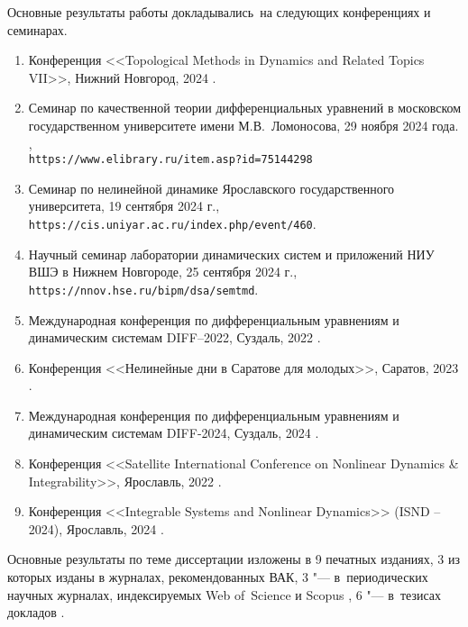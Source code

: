 {\probation}
Основные результаты работы докладывались~на следующих конференциях и семинарах.
\begin{enumerate}
	\item Конференция <<Topological Methods in Dynamics and Related Topics VII>>, Нижний Новгород, 2024 \cite{confbib6}.
	\item Семинар по качественной теории дифференциальных уравнений в московском государственном университете имени М.В.~Ломоносова, 29 ноября 2024 года. \cite{Sergeev2024},\\\texttt{https://www.elibrary.ru/item.asp?id=75144298}
	\item Семинар по нелинейной динамике Ярославского государственного университета, 19 сентября 2024 г.,\\\texttt{https://cis.uniyar.ac.ru/index.php/event/460}.
	\item Научный семинар лаборатории динамических систем и приложений НИУ ВШЭ в Нижнем Новгороде, 25 сентября 2024 г.,\\\texttt{https://nnov.hse.ru/bipm/dsa/semtmd}.
	\item Международная конференция по дифференциальным уравнениям и динамическим системам DIFF--2022, Суздаль, 2022  \cite{confbib1}.
	\item Конференция <<Нелинейные дни в Саратове для молодых>>, Саратов, 2023 \cite{confbib2}.
	\item Международная конференция по дифференциальным уравнениям и динамическим системам DIFF-2024, Суздаль, 2024 \cite{confbib3}.
	\item Конференция <<Satellite International Conference on Nonlinear Dynamics {\&} Integrability>>, Ярославль, 2022 \cite{confbib4}.
	\item Конференция <<Integrable Systems and Nonlinear Dynamics>> (ISND – 2024), Ярославль, 2024 \cite{confbib5}.
\end{enumerate}



{\publications} Основные результаты по теме диссертации изложены в 9 печатных изданиях, 3 из которых \cite{wosbib1,wosbib2,scbib1} изданы в журналах, рекомендованных ВАК, 3 "--- в~периодических научных журналах, индексируемых Web of~Science и Scopus \cite{wosbib1,wosbib2,scbib1}, 6 "--- в~тезисах докладов \cite{confbib1,confbib2,confbib3,confbib4,confbib5,confbib6}.

